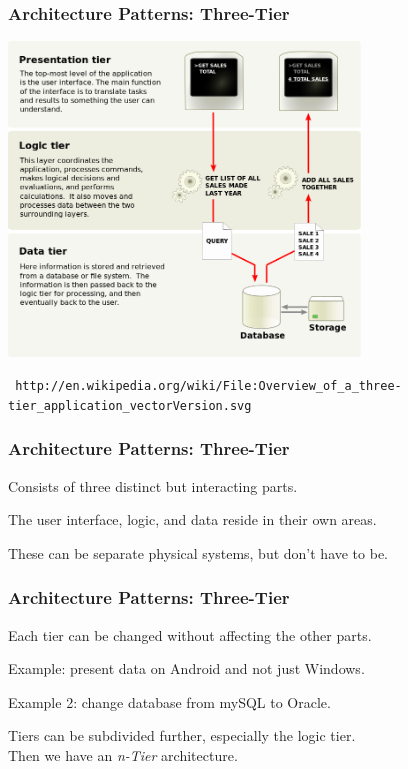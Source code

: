 \begin{frame}
\frametitle{Architecture Patterns: Three-Tier}

\begin{center}
	\includegraphics[width=0.7\textwidth]{images/threetier.png}
	
	\texttt{\tiny
 http://en.wikipedia.org/wiki/File:Overview\_of\_a\_three-tier\_application\_vectorVersion.svg}
\end{center}

\end{frame}

\begin{frame}
\frametitle{Architecture Patterns: Three-Tier}

\begin{changemargin}{1cm}
Consists of three distinct but interacting parts.

The user interface, logic, and data reside in their own areas.

These can be separate physical systems, but don't have to be.

\end{changemargin}
\end{frame}

\begin{frame}
\frametitle{Architecture Patterns: Three-Tier}

\begin{changemargin}{1cm}
Each tier can be changed without affecting the other parts.

Example: present data on Android and not just Windows.

Example 2: change database from mySQL to Oracle.

Tiers can be subdivided further, especially the logic tier.\\
\quad Then we have an \textit{n-Tier} architecture.


\end{changemargin}
\end{frame}

